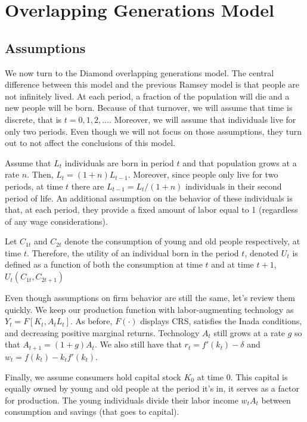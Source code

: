 \documentclass[12pt]{report}
\begin{document}
\chapter{Overlapping Generations Model}

\section{Assumptions}

We now turn to the Diamond overlapping generations model. The central difference between this model and the previous Ramsey model is that people are not infinitely lived. At each period, a fraction of the population will die and a new people will be born. Because of that turnover, we will assume that time is discrete, that is $t=0,1, 2, ...$. Moreover, we will assume that individuals live for only two periods. Even though we will not focus on those assumptions, they turn out to not affect the conclusions of this model.

Assume that $L_t$ individuals are born in period $t$ and that population grows at a rate $n$. Then, $L_t = (1 + n)L_{t-1}$. Moreover, since people only live for two periods, at time $t$ there are $L_{t-1} = L_t/(1+n)$ individuals in their second period of life. An additional assumption on the behavior of these individuals is that, at each period, they provide a fixed amount of labor equal to 1 (regardless of any wage considerations).

Let $C_{1t}$ and $C_{2t}$ denote the consumption of young and old people respectively, at time $t$. Therefore, the utility of an individual born in the period $t$, denoted $U_t$ is defined as a function of both the consumption at time $t$ and at time $t+1$, 
$U_t(C_{1t},C_{2t+1})$

Even though assumptions on firm behavior are still the same, let's review them quickly. We keep our production function with labor-augmenting technology as $Y_t = F[K_t, A_tL_t]$. As before, $F(\cdot)$ displays CRS, satisfies the Inada conditions, and decreasing positive marginal returns. Technology $A_t$ still grows at a rate $g$ so that $A_{t+1} = (1 + g)A_t$. We also still have that $r_t = f'(k_t) - \delta$ and $w_t = f(k_t) - k_tf'(k_t)$. 

Finally, we assume consumers hold capital stock $K_0$ at time $0$. This capital is equally owned by young and old people at the period it's in, it serves as a factor for production. The young individuals divide their labor income $w_tA_t$ between consumption and savings (that goes to capital).
\end{document}

